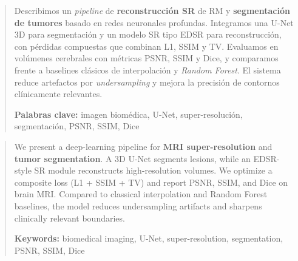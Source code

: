 \documentclass[12pt,a4paper,twoside,openright]{book}
\begin{document}

\frontmatter

\renewcommand{\abstractname}{Resumen}
\begin{abstract}
Describimos un \emph{pipeline} de \textbf{reconstrucción SR} de RM y
\textbf{segmentación de tumores} basado en redes neuronales profundas.
Integramos una U-Net 3D para segmentación y un modelo SR tipo EDSR para
reconstrucción, con pérdidas compuestas que combinan L1, SSIM y TV.
Evaluamos en volúmenes cerebrales con métricas PSNR, SSIM y Dice, y
comparamos frente a baselines clásicos de interpolación y \emph{Random
Forest}. El sistema reduce artefactos por \emph{undersampling} y mejora
la precisión de contornos clínicamente relevantes.
\medskip

\noindent\textbf{Palabras clave:} imagen biomédica, U-Net, super-resolución,
segmentación, PSNR, SSIM, Dice
\end{abstract}

\renewcommand{\abstractname}{Abstract}
\begin{abstract}
We present a deep-learning pipeline for \textbf{MRI super-resolution} and
\textbf{tumor segmentation}. A 3D U-Net segments lesions, while an EDSR-style
SR module reconstructs high-resolution volumes. We optimize a composite loss
(L1 + SSIM + TV) and report PSNR, SSIM, and Dice on brain MRI.
Compared to classical interpolation and Random Forest baselines, the model
reduces undersampling artifacts and sharpens clinically relevant boundaries.
\medskip

\noindent\textbf{Keywords:} biomedical imaging, U-Net, super-resolution,
segmentation, PSNR, SSIM, Dice
\end{abstract}
\end{document}
